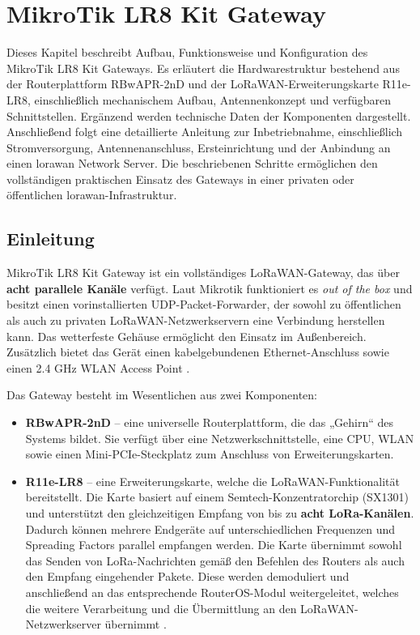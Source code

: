 %
%

\chapter{MikroTik LR8 Kit Gateway}
	Dieses Kapitel beschreibt Aufbau, Funktionsweise und Konfiguration des MikroTik LR8 Kit Gateways. Es erläutert die Hardwarestruktur bestehend aus der Routerplattform RBwAPR-2nD und der LoRaWAN-Erweiterungskarte R11e-LR8, einschließlich mechanischem Aufbau, Antennenkonzept und verfügbaren Schnittstellen. Ergänzend werden technische Daten der Komponenten dargestellt. Anschließend folgt eine detaillierte Anleitung zur Inbetriebnahme, einschließlich Stromversorgung, Antennenanschluss, Ersteinrichtung und der Anbindung an einen \ac{lorawan} Network Server. Die beschriebenen Schritte ermöglichen den vollständigen praktischen Einsatz des Gateways in einer privaten oder öffentlichen \ac{lorawan}-Infrastruktur.

\section{Einleitung}
	MikroTik LR8 Kit Gateway ist ein vollständiges LoRaWAN-Gateway, das über \textbf{acht parallele Kanäle} verfügt. Laut Mikrotik funktioniert es \emph{out of the box} und besitzt einen vorinstallierten UDP-Packet-Forwarder, der sowohl zu öffentlichen als auch zu privaten LoRaWAN-Netzwerkservern eine Verbindung herstellen kann. Das wetterfeste Gehäuse ermöglicht den Einsatz im Au{\ss}enbereich. Zusätzlich bietet das Gerät einen kabelgebundenen Ethernet-Anschluss sowie einen 2.4 GHz WLAN Access Point \cite{mikrotik:2020}.
	
	Das Gateway besteht im Wesentlichen aus zwei Komponenten:
	\begin{itemize}
		\item \textbf{RBwAPR-2nD} – eine universelle Routerplattform, die das „Gehirn“ des Systems bildet. Sie verfügt über eine Netzwerkschnittstelle, eine CPU, WLAN sowie einen Mini-PCIe-Steckplatz zum Anschluss von Erweiterungskarten.
		\item \textbf{R11e-LR8} – eine Erweiterungskarte, welche die LoRaWAN-Funktionalität bereitstellt. Die Karte basiert auf einem Semtech-Konzentratorchip (SX1301) und unterstützt den gleichzeitigen Empfang von bis zu \textbf{acht LoRa-Kanälen}. Dadurch können mehrere Endgeräte auf unterschiedlichen Frequenzen und Spreading Factors parallel empfangen werden. Die Karte übernimmt sowohl das Senden von LoRa-Nachrichten gemä{\ss} den Befehlen des Routers als auch den Empfang eingehender Pakete. Diese werden demoduliert und anschlie{\ss}end an das entsprechende RouterOS-Modul weitergeleitet, welches die weitere Verarbeitung und die Übermittlung an den LoRaWAN-Netzwerkserver übernimmt \cite{mikrotik:2020} \cite{mikrotik:2024}.
	\end{itemize}

